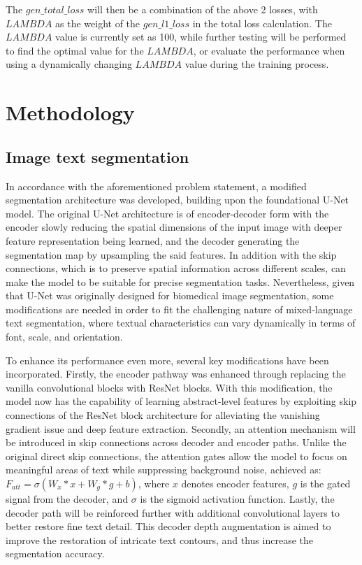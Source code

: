 \documentclass[10pt,twocolumn,letterpaper]{article}
\begin{document}
The $gen\_total\_loss$ will then be a combination of the above 2 losses, with $LAMBDA$ as the weight of the $gen\_l1\_loss$ in the total loss calculation. The $LAMBDA$
value is currently set as 100, while further testing will be performed to find the optimal value for the $LAMBDA$, or evaluate the performance when using a dynamically
changing $LAMBDA$ value during the training process.

\section{Methodology}

\subsection{Image text segmentation}

In accordance with the aforementioned problem statement, a modified segmentation architecture was developed, building upon the foundational U-Net model. 
The original U-Net architecture is of encoder-decoder form with the encoder slowly reducing the spatial dimensions of the input image with 
deeper feature representation being learned, and the decoder generating the segmentation map by upsampling the said features. 
In addition with the skip connections, which is to preserve spatial information across different scales, can make the model to be suitable
for precise segmentation tasks. Nevertheless, given that U-Net was originally designed for biomedical image segmentation, 
some modifications are needed in order to fit the challenging nature of mixed-language text segmentation, where textual characteristics can vary 
dynamically in terms of font, scale, and orientation. 

To enhance its performance even more, several key modifications have been incorporated. Firstly, the encoder pathway was enhanced through replacing 
the vanilla convolutional blocks with ResNet blocks. With this modification, the model now has the capability of learning abstract-level features 
by exploiting skip connections of the ResNet block architecture for alleviating the vanishing gradient issue and deep feature extraction. 
Secondly, an attention mechanism will be introduced in skip connections across decoder and encoder paths. Unlike the original direct skip connections, 
the attention gates allow the model to focus on meaningful areas of text while suppressing background noise, 
achieved as: $F_{att} = \sigma(W_x * x + W_g * g + b)$, where $x$ denotes encoder features, $g$ is the gated signal from the decoder, 
and $\sigma$ is the sigmoid activation function. 
Lastly, the decoder path will be reinforced further with additional convolutional layers to better restore fine text detail. 
This decoder depth augmentation is aimed to improve the restoration of intricate text contours, and thus increase the segmentation accuracy.
\end{document}
